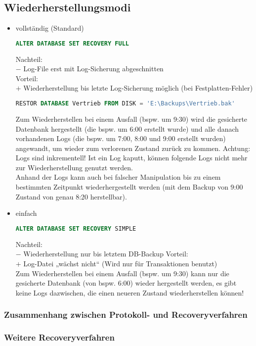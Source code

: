 \subsection{Wiederherstellungsmodi}
\begin{itemize}
\item vollständig (Standard)
\begin{lstlisting}[language=SQL]
ALTER DATABASE SET RECOVERY FULL
\end{lstlisting}
Nachteil: \\
$-$ Log-File erst mit Log-Sicherung abgeschnitten\\
Vorteil:\\
$+$ Wiederherstellung bis letzte Log-Sicherung möglich (bei Festplatten-Fehler)
\begin{lstlisting}[language=SQL]
RESTOR DATABASE Vertrieb FROM DISK = 'E:\Backups\Vertrieb.bak'
\end{lstlisting}
Zum Wiederherstellen bei einem Ausfall (bspw. um 9:30) wird die gesicherte Datenbank hergestellt (die bspw. um 6:00 erstellt wurde) und alle danach vorhandenen Logs (die bspw. um 7:00, 8:00 und 9:00 erstellt wurden) angewandt, um wieder zum verlorenen Zustand zurück zu kommen. Achtung: Logs sind inkrementell! Ist ein Log kaputt, können folgende Logs nicht mehr zur Wiederherstellung genutzt werden.\\
Anhand der Logs kann auch bei falscher Manipulation bis zu einem bestimmten Zeitpunkt wiederhergestellt werden (mit dem Backup von 9:00 Zustand von genau 8:20 herstellbar).
\item einfach
\begin{lstlisting}[language=SQL]
ALTER DATABASE SET RECOVERY SIMPLE
\end{lstlisting}
Nachteil:\\
$-$ Wiederherstellung nur bis letztem DB-Backup
Vorteil:\\
$+$ Log-Datei „wächst nicht“ (Wird nur für Transaktionen benutzt)\\
Zum Wiederherstellen bei einem Ausfall (bspw. um 9:30) kann nur die gesicherte Datenbank (von bspw. 6:00) wieder hergestellt werden, es gibt keine Logs dazwischen, die einen neueren Zustand wiederherstellen können!
\end{itemize}
\subsubsection{Zusammenhang zwischen Protokoll- und Recoveryverfahren}
\subsubsection{Weitere Recoveryverfahren}
